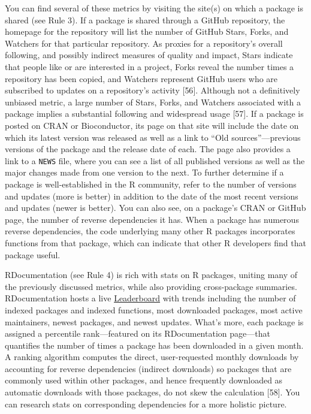 \documentclass[10pt,letterpaper]{article}
\begin{document}
You can find several of these metrics by visiting the site(s) on which a
package is shared (see Rule 3). If a package is shared through a GitHub
repository, the homepage for the repository will list the number of
GitHub Stars, Forks, and Watchers for that particular repository. As
proxies for a repository's overall following, and possibly indirect
measures of quality and impact, Stars indicate that people like or are
interested in a project, Forks reveal the number times a repository has
been copied, and Watchers represent GitHub users who are subscribed to
updates on a repository's activity {[}56{]}. Although not a definitively
unbiased metric, a large number of Stars, Forks, and Watchers associated
with a package implies a substantial following and widespread usage
{[}57{]}. If a package is posted on CRAN or Bioconductor, its page on
that site will include the date on which its latest version was released
as well as a link to ``Old sources''---previous versions of the package
and the release date of each. The page also provides a link to a
\texttt{NEWS} file, where you can see a list of all published versions
as well as the major changes made from one version to the next. To
further determine if a package is well-established in the R community,
refer to the number of versions and updates (more is better) in addition
to the date of the most recent versions and updates (newer is better).
You can also see, on a package's CRAN or GitHub page, the number of
reverse dependencies it has. When a package has numerous reverse
dependencies, the code underlying many other R packages incorporates
functions from that package, which can indicate that other R developers
find that package useful.

RDocumentation (see Rule 4) is rich with stats on R packages, uniting
many of the previously discussed metrics, while also providing
cross-package summaries. RDocumentation hosts a live
\href{https://www.rdocumentation.org/trends}{Leaderboard} with trends
including the number of indexed packages and indexed functions, most
downloaded packages, most active maintainers, newest packages, and
newest updates. What's more, each package is assigned a percentile
rank---featured on its RDocumentation page---that quantifies the number
of times a package has been downloaded in a given month. A ranking
algorithm computes the direct, user-requested monthly downloads by
accounting for reverse dependencies (indirect downloads) so packages
that are commonly used within other packages, and hence frequently
downloaded as automatic downloads with those packages, do not skew the
calculation {[}58{]}. You can research stats on corresponding
dependencies for a more holistic picture.
\end{document}
